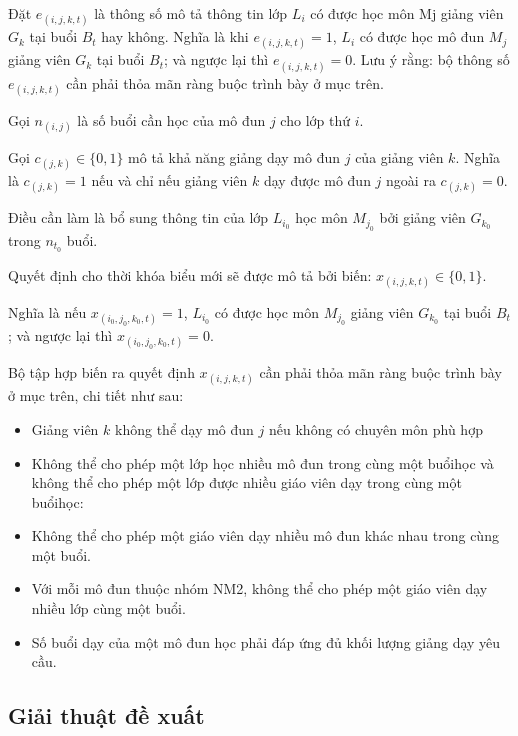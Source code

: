 \documentclass[11pt]{article}
\begin{document}
Đặt $e_{(i,j,k,t)}$ là thông số mô tả thông tin lớp $L_i$ có được học môn Mj giảng viên $G_k$ tại buổi $B_t$ hay không. 
Nghĩa là khi $e_{(i,j,k,t)} = 1$, $L_i$ có được học mô đun $M_j$ giảng viên $G_k$ tại buổi $B_t$; 
và ngược lại thì $e_{(i,j,k,t)} = 0$. 
Lưu ý rằng: bộ thông số $e_{(i,j,k,t)}$ cần phải thỏa mãn ràng buộc trình bày ở mục trên.

Gọi $n_{(i,j)}$ là số buổi cần học của mô đun $j$ cho lớp thứ $i$.

Gọi $c_{(j,k)} \in \{0,1\}$ mô tả khả năng giảng dạy mô đun $j$ của giảng viên $k$. 
Nghĩa là $c_{(j,k)} = 1$ nếu và chỉ nếu giảng viên $k$ dạy được mô đun $j$ ngoài ra $c_{(j,k)} = 0$.

Điều cần làm là bổ sung thông tin của lớp $L_{i_0}$ học môn $M_{j_0}$ bởi giảng viên $G_{k_0}$  trong $n_{t_0}$ buổi.

Quyết định cho thời khóa biểu mới sẽ được mô tả bởi biến: $x_{(i,j,k,t)} \in \{0,1\}$. 

Nghĩa là nếu $x_{(i_0,j_0,k_0, t)} = 1$, $L_{i_0}$ có được học môn $M_{j_0}$ giảng viên $G_{k_0}$ tại buổi $B_t$; 
và ngược lại thì $x_{(i_0,j_0,k_0, t)} = 0$.

Bộ tập hợp biến ra quyết định $x_{(i,j,k,t)}$ cần phải thỏa mãn ràng buộc trình bày ở mục trên, chi tiết như sau:
\begin{itemize}
\item	Giảng viên $k$ không thể dạy mô đun $j$ nếu không có chuyên môn phù hợp

\item	Không thể cho phép một lớp học nhiều mô đun trong cùng một buổihọc và không thể cho phép một lớp được nhiều giáo viên dạy trong cùng một buổihọc:

\item	Không thể cho phép một giáo viên dạy nhiều mô đun khác nhau trong cùng một buổi.

\item	Với mỗi mô đun thuộc nhóm NM2, không thể cho phép một giáo viên dạy nhiều lớp cùng một buổi.

\item	Số buổi dạy của một mô đun học phải đáp ứng đủ khối lượng giảng dạy yêu cầu. 
\end{itemize}



\subsection{\texorpdfstring{Giải thuật đề xuất}{Proposed algorithm}}\label{subPb2}
%
\end{document}
